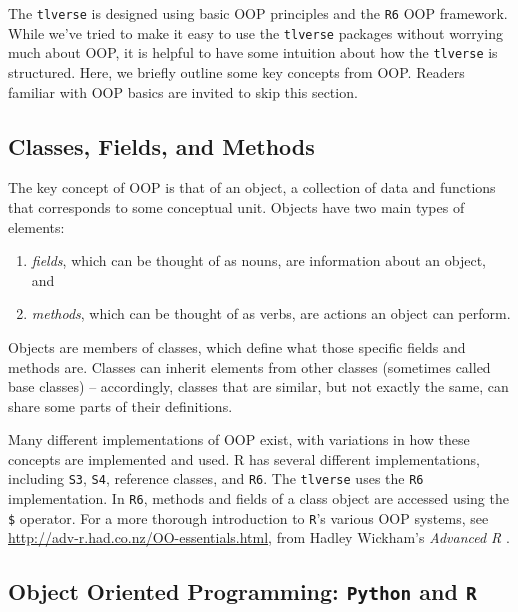 \documentclass[12pt, krantz2,]{krantz}
\providecommand{\tightlist}{%
  \setlength{\itemsep}{0pt}\setlength{\parskip}{0pt}}
\theoremstyle{definition}
\theoremstyle{definition}
\theoremstyle{definition}
\newcommand{\1}{\mathbbm{1}}
\begin{document}
The \texttt{tlverse} is designed using basic OOP principles and the \texttt{R6} OOP framework.
While we've tried to make it easy to use the \texttt{tlverse} packages without worrying
much about OOP, it is helpful to have some intuition about how the \texttt{tlverse} is
structured. Here, we briefly outline some key concepts from OOP. Readers
familiar with OOP basics are invited to skip this section.

\hypertarget{classes-fields-and-methods}{%
\subsection{Classes, Fields, and Methods}\label{classes-fields-and-methods}}

The key concept of OOP is that of an object, a collection of data and functions
that corresponds to some conceptual unit. Objects have two main types of
elements:

\begin{enumerate}
\def\labelenumi{\arabic{enumi}.}
\tightlist
\item
  \emph{fields}, which can be thought of as nouns, are information about an object,
  and
\item
  \emph{methods}, which can be thought of as verbs, are actions an object can
  perform.
\end{enumerate}

Objects are members of classes, which define what those specific fields and
methods are. Classes can inherit elements from other classes (sometimes called
base classes) -- accordingly, classes that are similar, but not exactly the
same, can share some parts of their definitions.

Many different implementations of OOP exist, with variations in how these
concepts are implemented and used. R has several different implementations,
including \texttt{S3}, \texttt{S4}, reference classes, and \texttt{R6}. The \texttt{tlverse} uses the \texttt{R6}
implementation. In \texttt{R6}, methods and fields of a class object are accessed using
the \texttt{\$} operator. For a more thorough introduction to \texttt{R}'s various OOP systems,
see \url{http://adv-r.had.co.nz/OO-essentials.html}, from Hadley Wickham's \emph{Advanced
R} \citep{wickham2014advanced}.

\hypertarget{object-oriented-programming-python-and-r}{%
\subsection{\texorpdfstring{Object Oriented Programming: \texttt{Python} and \texttt{R}}{Object Oriented Programming: Python and R}}\label{object-oriented-programming-python-and-r}}
\end{document}
